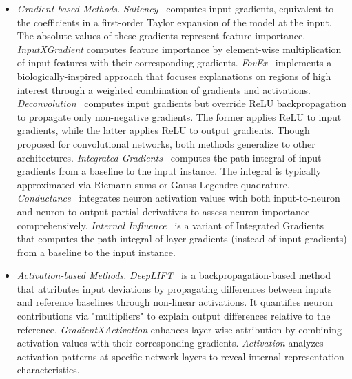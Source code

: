 \documentclass{article}
\begin{document}
\begin{itemize}[leftmargin=*]
    \item \textit{Gradient-based Methods.} 
\textit{Saliency~\cite{simonyan2014deepinsideconvolutionalnetworks}} computes input gradients, equivalent to the coefficients in a first-order Taylor expansion of the model at the input. The absolute values of these gradients represent feature importance.
    \textit{InputXGradient} computes feature importance by element-wise multiplication of input features with their corresponding gradients.
\textit{FovEx~\cite{panda2024human}} implements a biologically-inspired approach that focuses explanations on regions of high interest through a weighted combination of gradients and activations.
\textit{Deconvolution~\cite{zeiler2013visualizingunderstandingconvolutionalnetworks}} computes input gradients but override ReLU backpropagation to propagate only non-negative gradients. The former applies ReLU to input gradients, while the latter applies ReLU to output gradients. Though proposed for convolutional networks, both methods generalize to other architectures.
\textit{Integrated Gradients~\cite{sundararajan2017axiomatic}} computes the path integral of input gradients from a baseline to the input instance. The integral is typically approximated via Riemann sums or Gauss-Legendre quadrature.
\textit{Conductance~\cite{dhamdhere2018importantneuron}} integrates neuron activation values with both input-to-neuron and neuron-to-output partial derivatives to assess neuron importance comprehensively.
\textit{Internal Influence~\cite{leino2018influencedirectedexplanationsdeepconvolutional}} is a variant of Integrated Gradients~\cite{sundararajan2017axiomatic} that computes the path integral of layer gradients (instead of input gradients) from a baseline to the input instance.

\item \textit{Activation-based Methods.}
\textit{DeepLIFT~\cite{li2021deep}} is a backpropagation-based method that attributes input deviations by propagating differences between inputs and reference baselines through non-linear activations. It quantifies neuron contributions via "multipliers" to explain output differences relative to the reference.
\textit{GradientXActivation} enhances layer-wise attribution by combining activation values with their corresponding gradients.
    \textit{Activation} analyzes activation patterns at specific network layers to reveal internal representation characteristics.


\end{itemize}
\end{document}
